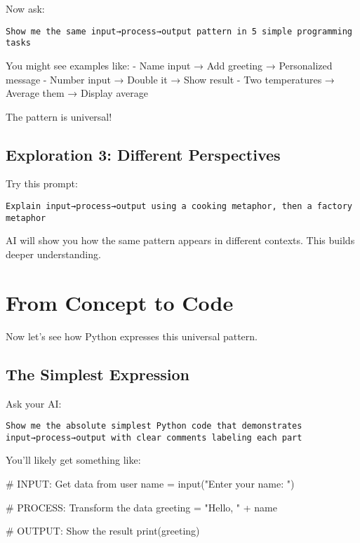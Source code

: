 \documentclass[
  letterpaper,
  DIV=11,
  numbers=noendperiod,
  oneside]{scrreprt}
\newenvironment{Shaded}{}{}
\newcommand{\BuiltInTok}[1]{\textcolor[rgb]{0.84,0.23,0.29}{#1}}
\newcommand{\CommentTok}[1]{\textcolor[rgb]{0.42,0.45,0.49}{#1}}
\newcommand{\NormalTok}[1]{\textcolor[rgb]{0.14,0.16,0.18}{#1}}
\newcommand{\OperatorTok}[1]{\textcolor[rgb]{0.14,0.16,0.18}{#1}}
\newcommand{\StringTok}[1]{\textcolor[rgb]{0.01,0.18,0.38}{#1}}
\begin{document}
Now ask:

\begin{verbatim}
Show me the same input→process→output pattern in 5 simple programming tasks
\end{verbatim}

You might see examples like: - Name input → Add greeting → Personalized
message - Number input → Double it → Show result - Two temperatures →
Average them → Display average

The pattern is universal!

\subsection{Exploration 3: Different
Perspectives}\label{exploration-3-different-perspectives}

Try this prompt:

\begin{verbatim}
Explain input→process→output using a cooking metaphor, then a factory metaphor
\end{verbatim}

AI will show you how the same pattern appears in different contexts.
This builds deeper understanding.

\section{From Concept to Code}\label{from-concept-to-code}

Now let's see how Python expresses this universal pattern.

\subsection{The Simplest Expression}\label{the-simplest-expression}

Ask your AI:

\begin{verbatim}
Show me the absolute simplest Python code that demonstrates input→process→output with clear comments labeling each part
\end{verbatim}

You'll likely get something like:

\begin{Shaded}
\begin{Highlighting}[]
\CommentTok{\# INPUT: Get data from user}
\NormalTok{name }\OperatorTok{=} \BuiltInTok{input}\NormalTok{(}\StringTok{"Enter your name: "}\NormalTok{)}

\CommentTok{\# PROCESS: Transform the data}
\NormalTok{greeting }\OperatorTok{=} \StringTok{"Hello, "} \OperatorTok{+}\NormalTok{ name}

\CommentTok{\# OUTPUT: Show the result}
\BuiltInTok{print}\NormalTok{(greeting)}
\end{Highlighting}
\end{Shaded}
\end{document}
